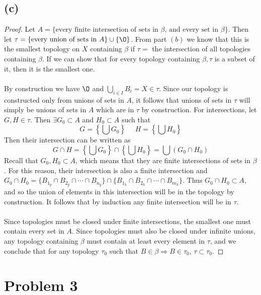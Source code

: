 \documentclass{article}
\begin{document}
\subsection*{(c)}
\begin{proof}
    Let $A = \{\text{every finite intersection of sets in $\beta$, and every set in $\beta$}\}$.
    Then let $\tau = \{\text{every union of sets in $A$}\} \cup \{\O\}$.
    From part $(b)$ we know that this is the smallest topology on $X$ containing $\beta$ if $\tau = $ the intersection of all topologies containing $\beta$.
    If we can show that for every topology containing $\beta, \tau$ is a subset of it, then it is the smallest one.
    \\\\
    By construction we have $\O$ and $\bigcup_{i \in I} B_i = X \in \tau$.
    Since our topology is constructed only from unions of sets in $A$, it follows that unions of sets in $\tau$
    will simply be unions of sets in $A$ which are in $\tau$ by construction.
    For intersections, let $G,H \in \tau$.
    Then $\exists G_0 \subset A$ and $H_0 \subset A$ such that
    \[
        G = \left\{\bigcup G_0 \right\} \ \ \ \ \ \ H = \left\{\bigcup H_0\right\}
    \]
    Then their intersection can be written as 
    \[
        G \cap H = \left\{\bigcup G_0\right\} \cap \left\{\bigcup H_0\right\} = \bigcup \left(G_0 \cap H_0\right)
    \]
    Recall that $G_0, H_0 \subset A$, which means that they are finite intersections of sets in $\beta$.
    For this reason, their intersection is also a finite intersection and $G_0 \cap H_0 = \{ B_{1_g} \cap B_{2_g} \cap \cdots \cap B_{n_g} \} \cap \{B_{1_h} \cap B_{2_h} \cap \cdots \cap B_{m_h}\}$.
    Thus $G_0 \cap H_0 \subset A$, and so the union of elements in this intersection will be in the topology by construction.
    It follows that by induction any finite intersection will be in $\tau$.
\\\\
    Since topologies must be closed under finite intersections, the smallest one must contain every set in $A$.
    Since topologies must also be closed under infinite unions, any topology containing $\beta$ must contain at least every element in $\tau$, and we conclude that
    for any topology $\tau_0$ such that $B \in \beta \Rightarrow B \in \tau_0$, $\tau \subset \tau_0$.
\end{proof}
\section*{Problem 3}
\end{document}
